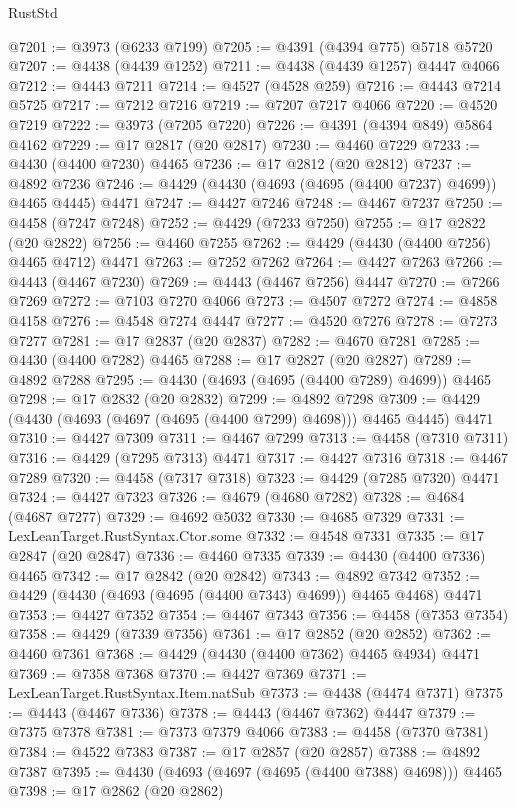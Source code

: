 \begin{lexlean}{RustStd}
\begin{coremodule}
{\begin{coremodule}
{{{{{{{{{{{{{{{{{{{{{{{{{{{{{{{{{{{{{{{{{{{{{{{{{{{{{{{{{{{{{{{{{{{{@7201 := @3973 (@6233 @7199)
@7205 := @4391 (@4394 @775) @5718 @5720
@7207 := @4438 (@4439 @1252)
@7211 := @4438 (@4439 @1257) @4447 @4066
@7212 := @4443 @7211
@7214 := @4527 (@4528 @259)
@7216 := @4443 @7214 @5725
@7217 := @7212 @7216
@7219 := @7207 @7217 @4066
@7220 := @4520 @7219
@7222 := @3973 (@7205 @7220)
@7226 := @4391 (@4394 @849) @5864 @4162
@7229 := @17 @2817 (@20 @2817)
@7230 := @4460 @7229
@7233 := @4430 (@4400 @7230) @4465
@7236 := @17 @2812 (@20 @2812)
@7237 := @4892 @7236
@7246 := @4429 (@4430 (@4693 (@4695 (@4400 @7237) @4699)) @4465 @4445) @4471
@7247 := @4427 @7246
@7248 := @4467 @7237
@7250 := @4458 (@7247 @7248)
@7252 := @4429 (@7233 @7250)
@7255 := @17 @2822 (@20 @2822)
@7256 := @4460 @7255
@7262 := @4429 (@4430 (@4400 @7256) @4465 @4712) @4471
@7263 := @7252 @7262
@7264 := @4427 @7263
@7266 := @4443 (@4467 @7230)
@7269 := @4443 (@4467 @7256) @4447
@7270 := @7266 @7269
@7272 := @7103 @7270 @4066
@7273 := @4507 @7272
@7274 := @4858 @4158
@7276 := @4548 @7274 @4447
@7277 := @4520 @7276
@7278 := @7273 @7277
@7281 := @17 @2837 (@20 @2837)
@7282 := @4670 @7281
@7285 := @4430 (@4400 @7282) @4465
@7288 := @17 @2827 (@20 @2827)
@7289 := @4892 @7288
@7295 := @4430 (@4693 (@4695 (@4400 @7289) @4699)) @4465
@7298 := @17 @2832 (@20 @2832)
@7299 := @4892 @7298
@7309 := @4429 (@4430 (@4693 (@4697 (@4695 (@4400 @7299) @4698))) @4465 @4445) @4471
@7310 := @4427 @7309
@7311 := @4467 @7299
@7313 := @4458 (@7310 @7311)
@7316 := @4429 (@7295 @7313) @4471
@7317 := @4427 @7316
@7318 := @4467 @7289
@7320 := @4458 (@7317 @7318)
@7323 := @4429 (@7285 @7320) @4471
@7324 := @4427 @7323
@7326 := @4679 (@4680 @7282)
@7328 := @4684 (@4687 @7277)
@7329 := @4692 @5032
@7330 := @4685 @7329
@7331 := LexLeanTarget.RustSyntax.Ctor.some
@7332 := @4548 @7331
@7335 := @17 @2847 (@20 @2847)
@7336 := @4460 @7335
@7339 := @4430 (@4400 @7336) @4465
@7342 := @17 @2842 (@20 @2842)
@7343 := @4892 @7342
@7352 := @4429 (@4430 (@4693 (@4695 (@4400 @7343) @4699)) @4465 @4468) @4471
@7353 := @4427 @7352
@7354 := @4467 @7343
@7356 := @4458 (@7353 @7354)
@7358 := @4429 (@7339 @7356)
@7361 := @17 @2852 (@20 @2852)
@7362 := @4460 @7361
@7368 := @4429 (@4430 (@4400 @7362) @4465 @4934) @4471
@7369 := @7358 @7368
@7370 := @4427 @7369
@7371 := LexLeanTarget.RustSyntax.Item.natSub
@7373 := @4438 (@4474 @7371)
@7375 := @4443 (@4467 @7336)
@7378 := @4443 (@4467 @7362) @4447
@7379 := @7375 @7378
@7381 := @7373 @7379 @4066
@7383 := @4458 (@7370 @7381)
@7384 := @4522 @7383
@7387 := @17 @2857 (@20 @2857)
@7388 := @4892 @7387
@7395 := @4430 (@4693 (@4697 (@4695 (@4400 @7388) @4698))) @4465
@7398 := @17 @2862 (@20 @2862)
}}}}}}}}}}}}}}}}}}}}}}}}}}}}}}}}}}}}}}}}}}}}}}}}}}}}}}}}}}}}}}}}}}}}
\end{coremodule}}
\end{coremodule}
\end{lexlean}

